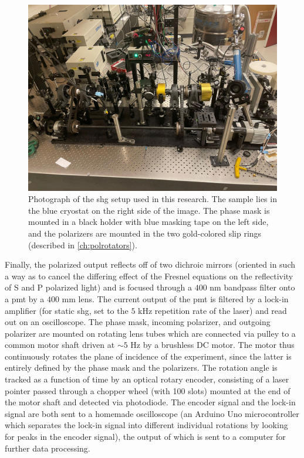 \begin{figure}
\includegraphics[width=\textwidth]{gfx/ch3/pdf/setup_real.pdf}
\caption[Photograph of the SHG setup.]{\label{fig:setup_real}Photograph of the \gls{shg} setup used in this research.
The sample lies in the blue cryostat on the right side of the image.
The phase mask is mounted in a black holder with blue masking tape on the left side, and the polarizers are mounted in the two gold-colored slip rings (described in \cref{ch:polrotators}).}
\end{figure}

Finally, the polarized output reflects off of two dichroic mirrors (oriented in such a way as to cancel the differing effect of the Fresnel equations on the reflectivity of S and P polarized light) and is focused through a $400$ \si{nm} bandpass filter onto a \gls{pmt} by a $400$ \si{mm} lens.
The current output of the \gls{pmt} is filtered by a lock-in amplifier (for static \gls{shg}, set to the $5$ \si{kHz} repetition rate of the laser) and read out on an oscilloscope.
The phase mask, incoming polarizer, and outgoing polarizer are mounted on rotating lens tubes which are connected via pulley to a common motor shaft driven at $\sim 5$ \si{Hz} by a brushless DC motor.
The motor thus continuously rotates the plane of incidence of the experiment, since the latter is entirely defined by the phase mask and the polarizers.
The rotation angle is tracked as a function of time by an optical rotary encoder, consisting of a laser pointer passed through a chopper wheel (with 100 slots) mounted at the end of the motor shaft and detected via photodiode.
The encoder signal and the lock-in signal are both sent to a homemade oscilloscope (an Arduino Uno microcontroller which separates the lock-in signal into different individual rotations by looking for peaks in the encoder signal), the output of which is sent to a computer for further data processing.

